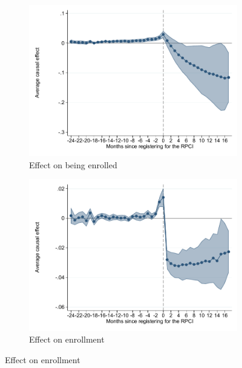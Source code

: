 \documentclass[oneside,11pt]{article}
\begin{document}
\begin{figure}[H]
\begin{center}
    \begin{subfigure}{0.49\textwidth}
    \caption{Effect on being enrolled}
    \includegraphics[width=\textwidth]{04_Figures/muestra_10porciento/event_study_alta_chaisemartin.pdf}
    \end{subfigure}
    \begin{subfigure}{0.49\textwidth}
    \caption{Effect on enrollment}
    \includegraphics[width=\textwidth]{04_Figures/muestra_10porciento/event_study_alta_cierre_chaisemartin.pdf}
    \end{subfigure}
    

\end{center}
\end{figure}
\end{document}
